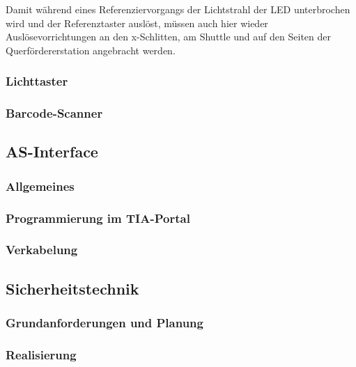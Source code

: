 Damit während eines Referenziervorgangs der Lichtstrahl der LED unterbrochen wird und der Referenztaster auslöst, müssen auch hier wieder Auslösevorrichtungen an den x-Schlitten, am Shuttle und auf den Seiten der Querfördererstation angebracht werden.

\subsubsection{Lichttaster}

\subsubsection{Barcode-Scanner}

\subsection{AS-Interface}

\subsubsection{Allgemeines}

\subsubsection{Programmierung im TIA-Portal}

\subsubsection{Verkabelung}


\subsection{Sicherheitstechnik}
\subsubsection{Grundanforderungen und Planung}
\subsubsection{Realisierung}